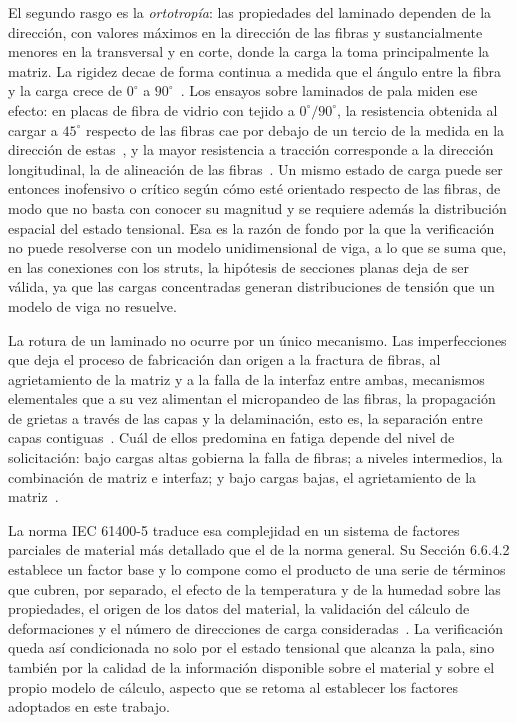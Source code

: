 El segundo rasgo es la \textit{ortotropía}: las propiedades del laminado dependen de la dirección, con valores máximos en la dirección de las fibras y sustancialmente menores en la transversal y en corte, donde la carga la toma principalmente la matriz. La rigidez decae de forma continua a medida que el ángulo entre la fibra y la carga crece de $0^\circ$ a $90^\circ$~\parencite{Brondsted2005,Huh2012}. Los ensayos sobre laminados de pala miden ese efecto: en placas de fibra de vidrio con tejido a $0^\circ/90^\circ$, la resistencia obtenida al cargar a $45^\circ$ respecto de las fibras cae por debajo de un tercio de la medida en la dirección de estas~\parencite{Moraras2023}, y la mayor resistencia a tracción corresponde a la dirección longitudinal, la de alineación de las fibras~\parencite{Ahmed2021}. Un mismo estado de carga puede ser entonces inofensivo o crítico según cómo esté orientado respecto de las fibras, de modo que no basta con conocer su magnitud y se requiere además la distribución espacial del estado tensional. Esa es la razón de fondo por la que la verificación no puede resolverse con un modelo unidimensional de viga, a lo que se suma que, en las conexiones con los struts, la hipótesis de secciones planas deja de ser válida, ya que las cargas concentradas generan distribuciones de tensión que un modelo de viga no resuelve.

La rotura de un laminado no ocurre por un único mecanismo. Las imperfecciones que deja el proceso de fabricación dan origen a la fractura de fibras, al agrietamiento de la matriz y a la falla de la interfaz entre ambas, mecanismos elementales que a su vez alimentan el micropandeo de las fibras, la propagación de grietas a través de las capas y la delaminación, esto es, la separación entre capas contiguas~\parencite{Brondsted2005}. Cuál de ellos predomina en fatiga depende del nivel de solicitación: bajo cargas altas gobierna la falla de fibras; a niveles intermedios, la combinación de matriz e interfaz; y bajo cargas bajas, el agrietamiento de la matriz~\parencite{Brondsted2005}.

La norma IEC 61400-5 traduce esa complejidad en un sistema de factores parciales de material más detallado que el de la norma general. Su Sección 6.6.4.2 establece un factor base y lo compone como el producto de una serie de términos que cubren, por separado, el efecto de la temperatura y de la humedad sobre las propiedades, el origen de los datos del material, la validación del cálculo de deformaciones y el número de direcciones de carga consideradas~\parencite{IEC61400-5}. La verificación queda así condicionada no solo por el estado tensional que alcanza la pala, sino también por la calidad de la información disponible sobre el material y sobre el propio modelo de cálculo, aspecto que se retoma al establecer los factores adoptados en este trabajo.

